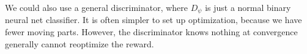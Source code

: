 We could also use a general discriminator, where $D_\psi$ is just a normal binary neural net classifier. It is often simpler to set up optimization, because we have fewer moving parts. However, the discriminator knows nothing at convergence generally cannot reoptimize the reward.
